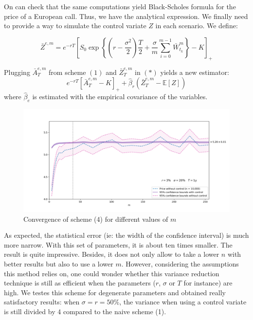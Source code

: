 \documentclass{article}
\begin{document}
On can check that the same computations yield Black-Scholes formula for the price of a European call.
Thus, we have the analytical expression. We finally need to provide a way to simulate the control variate $Z$
in each scenario. We define:

\begin{equation}
	\bar Z^{e, m} = e^{-rT} \left[ S_0 \exp \left\{ \left( r - \frac{\sigma^2}{2} \right) \frac{T}{2} +
		\frac{\sigma}{m} \sum_{i=0}^{m-1} \bar W_{t_k}^m \right\} - K \right]_+
	\tag{$i$}
\end{equation}

Plugging $\bar A_T^{e, m}$ from scheme $(1)$ and $\bar Z_T^{e, m}$ in $(\ast)$ yields a new estimator:
\begin{equation}
	e^{-rT} \left[ \bar A_T^{e, m} - K \right]_+ + \hat\beta_r \left( \bar Z_T^{e, m} - \mathbb E [Z] \right)
	\tag{4}
\end{equation}
where $\hat\beta_e$ is estimated with the empirical covariance of the variables.

\begin{figure}[H]
  \hspace*{-0.1\linewidth}\includegraphics[width=1.1\textwidth]{charts/cvgce_control.png}
  \caption{Convergence of scheme (4) for different values of $m$}
\end{figure}

As expected, the statistical error (ie: the width of the confidence interval) is much more narrow. With this set of
parameters, it is about ten times smaller. The result is quite impressive. Besides, it does not only allow to take
a lower $n$ with better results but also to use a lower $m$. However, considering the assumptions this method relies on,
one could wonder whether this variance reduction technique is still as efficient when the parameters
($r$, $\sigma$ or $T$ for instance) are high. We testes this scheme for degenerate parameters and obtained really
satisfactory results: when $\sigma = r = 50\%$, the variance when using a control variate is still divided by 4
compared to the naive scheme (1).
\end{document}
